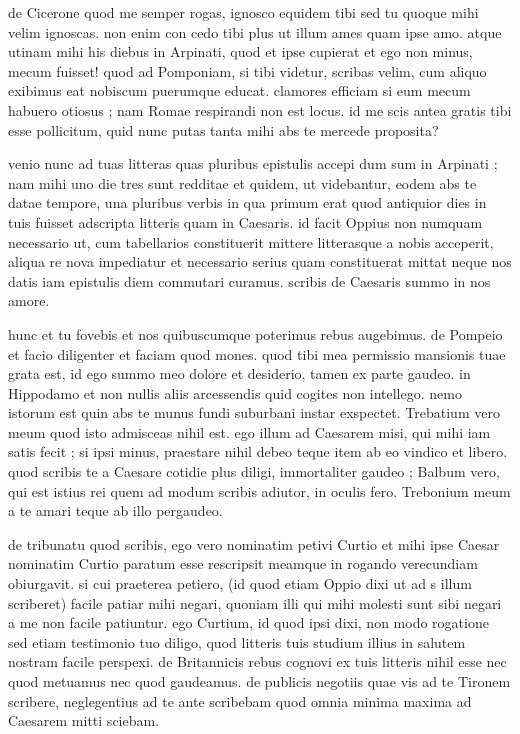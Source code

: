  de Cicerone quod me semper rogas, ignosco equidem tibi sed tu quoque mihi velim ignoscas. non enim con cedo tibi plus ut illum ames quam ipse amo. atque utinam mihi his diebus in Arpinati, quod et ipse cupierat et ego non minus, mecum fuisset! quod ad Pomponiam, si tibi videtur, scribas velim, cum aliquo exibimus eat nobiscum puerumque educat. clamores efficiam si eum mecum habuero otiosus ; nam Romae respirandi non est locus. id me scis antea gratis tibi esse pollicitum, quid nunc putas tanta mihi abs te mercede proposita?

 venio nunc ad tuas litteras quas pluribus epistulis accepi dum sum in Arpinati ; nam mihi uno die tres sunt redditae et quidem, ut videbantur, eodem abs te datae tempore, una pluribus verbis in qua primum erat quod antiquior dies in tuis fuisset adscripta litteris quam in Caesaris. id facit Oppius non numquam necessario ut, cum tabellarios constituerit mittere litterasque a nobis acceperit, aliqua re nova impediatur et necessario serius quam constituerat mittat neque nos datis iam epistulis diem commutari curamus. scribis de Caesaris summo in nos amore.

 hunc et tu fovebis et nos quibuscumque poterimus rebus augebimus. de Pompeio et facio diligenter et faciam quod mones. quod tibi mea permissio mansionis tuae grata est, id ego summo meo dolore et desiderio, tamen ex parte gaudeo. in Hippodamo et non nullis aliis arcessendis quid cogites non intellego. nemo istorum est quin abs te munus fundi suburbani instar exspectet. Trebatium vero meum quod isto admisceas nihil est. ego illum ad Caesarem misi, qui mihi iam satis fecit ; si ipsi minus, praestare nihil debeo teque item ab eo vindico et libero. quod scribis te a Caesare cotidie plus diligi, immortaliter gaudeo ; Balbum vero, qui est istius rei quem ad modum scribis adiutor, in oculis fero. Trebonium meum a te amari teque ab illo pergaudeo.

 de tribunatu quod scribis, ego vero nominatim petivi Curtio et mihi ipse Caesar nominatim Curtio paratum esse rescripsit meamque in rogando verecundiam obiurgavit. si cui praeterea petiero, (id quod etiam Oppio dixi ut ad s illum scriberet) facile patiar mihi negari, quoniam illi qui mihi molesti sunt sibi negari a me non facile patiuntur. ego Curtium, id quod ipsi dixi, non modo rogatione sed etiam testimonio tuo diligo, quod litteris tuis studium illius in salutem nostram facile perspexi. de Britannicis rebus cognovi ex tuis litteris nihil esse nec quod metuamus nec quod gaudeamus. de publicis negotiis quae vis ad te Tironem scribere, neglegentius ad te ante scribebam quod omnia minima maxima ad Caesarem mitti sciebam.

